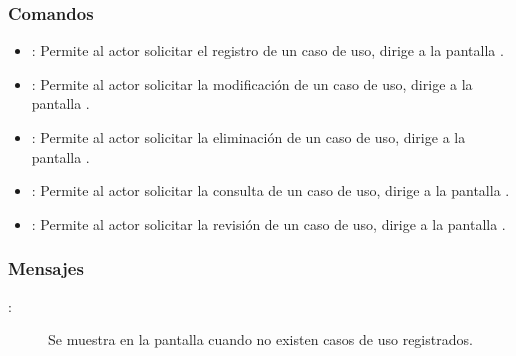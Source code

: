 \subsubsection{Comandos}
\begin{itemize}
	\item {}: Permite al actor solicitar el registro de un caso de uso, dirige a la pantalla .
	\item \btnEditar[Modificar]: Permite al actor solicitar la modificación de un caso de uso, dirige a la pantalla .
	\item \btnEliminar[Eliminar]: Permite al actor solicitar la eliminación de un caso de uso, dirige a la pantalla .
	\item \btnConsulta[Consultar]: Permite al actor solicitar la consulta de un caso de uso, dirige a la pantalla .
	\item \btnRevisar[Revisar]: Permite al actor solicitar la revisión de un caso de uso, dirige a la pantalla .
\end{itemize}

\subsubsection{Mensajes}

	
\begin{description}
	\item[:] Se muestra en la pantalla  cuando no existen casos de uso registrados.
\end{description}
